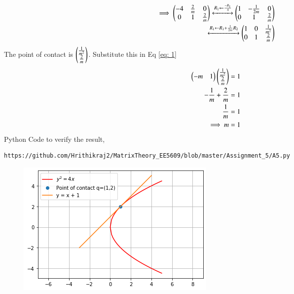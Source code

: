 \documentclass[journal,12pt,twocolumn]{IEEEtran}
\begin{document}
\begin{align}
\implies \begin{pmatrix}-4 & \frac{2}{m} & 0 \\ 0 & 1 & \frac{2}{m}\end{pmatrix}
\xleftrightarrow{R_1\leftarrow \frac{-R_1}{4}}
\begin{pmatrix}1 & -\frac{1}{2m} & 0 \\ 0 & 1 & \frac{2}{m}\end{pmatrix}\\
\xleftrightarrow{R_1\leftarrow R_1 + \frac{1}{2m}R_2}
\begin{pmatrix}1 & 0 & \frac{1}{m^2} \\ 0 & 1 & \frac{2}{m}\end{pmatrix}\\
\end{align}
The point of contact is $\begin{pmatrix}\frac{1}{m^2} \\ \frac{2}{m}\end{pmatrix}$. Substitute this in Eq \eqref{eq: 1}
\begin{align}
    \begin{pmatrix}-m & 1\end{pmatrix}\begin{pmatrix}\frac{1}{m^2} \\ \frac{2}{m}\end{pmatrix} = 1\\
    -\frac{1}{m} + \frac{2}{m} = 1\\
    \frac{1}{m} = 1\\
    \implies m = 1
\end{align}
Python Code to verify the result, 
\begin{lstlisting}
https://github.com/Hrithikraj2/MatrixTheory_EE5609/blob/master/Assignment_5/A5.py
\end{lstlisting}
\begin{figure}[!ht]
\centering
\includegraphics[width=\columnwidth]{A5.png}
\caption{}
\label{Fig:1}
\end{figure}
\end{document}
